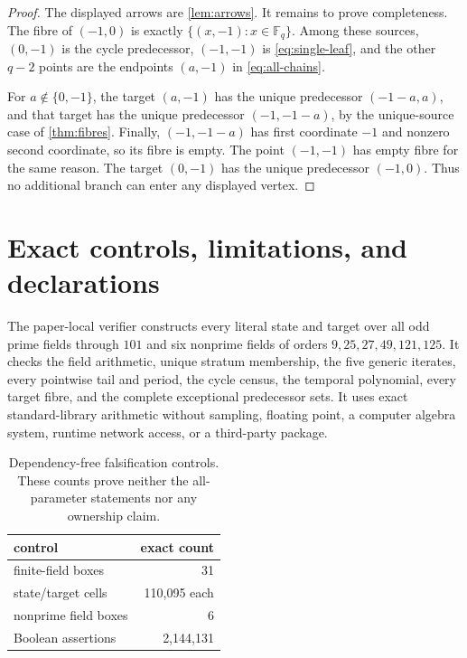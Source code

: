 \documentclass[10pt,a4paper]{amsart}
\theoremstyle{definition}
\theoremstyle{remark}
\newcommand{\F}{\mathbb F}
\begin{document}
\begin{proof}
The displayed arrows are \cref{lem:arrows}.  It remains to prove
completeness.  The fibre of $(-1,0)$ is exactly
$\{(x,-1):x\in\F_q\}$.  Among these sources, $(0,-1)$ is the cycle
predecessor, $(-1,-1)$ is \eqref{eq:single-leaf}, and the other $q-2$ points
are the endpoints $(a,-1)$ in \eqref{eq:all-chains}.

For $a\notin\{0,-1\}$, the target $(a,-1)$ has the unique predecessor
$(-1-a,a)$, and that target has the unique predecessor $(-1,-1-a)$, by the
unique-source case of \cref{thm:fibres}.  Finally,
$(-1,-1-a)$ has first coordinate $-1$ and nonzero second coordinate, so its
fibre is empty.  The point $(-1,-1)$ has empty fibre for the same reason.
The target $(0,-1)$ has the unique predecessor $(-1,0)$.  Thus no additional
branch can enter any displayed vertex.
\end{proof}

\section{Exact controls, limitations, and declarations}\label{sec:controls}

The paper-local verifier constructs every literal state and target over all
odd prime fields through $101$ and six nonprime fields of orders
$9,25,27,49,121,125$.  It checks the field arithmetic, unique stratum
membership, the five generic iterates, every pointwise tail and period, the
cycle census, the temporal polynomial, every target fibre, and the complete
exceptional predecessor sets.  It uses exact standard-library arithmetic
without sampling, floating point, a computer algebra system, runtime network
access, or a third-party package.

\begin{table}[!htbp]
\centering
\small
\begin{tabular}{@{}lr@{}}
\toprule
control & exact count\\
\midrule
finite-field boxes & 31\\
state/target cells & 110,095 each\\
nonprime field boxes & 6\\
Boolean assertions & 2,144,131\\
\bottomrule
\end{tabular}
\caption{Dependency-free falsification controls.  These counts prove neither
the all-parameter statements nor any ownership claim.}
\label{tab:controls}
\end{table}
\end{document}
